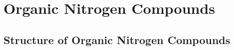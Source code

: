 \documentclass[../main]{subfiles}
\begin{document}
\section{Organic Nitrogen Compounds}

	\subsection{Structure of Organic Nitrogen Compounds}
\end{document}
